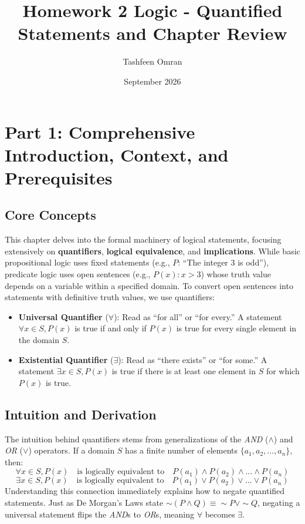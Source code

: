 \documentclass[12pt]{article}
\title{\textbf{Homework 2 Logic - Quantified Statements and Chapter Review}}
\author{Tashfeen Omran}
\date{September 2026}
\begin{document}
\maketitle
\tableofcontents
\newpage

\section{Part 1: Comprehensive Introduction, Context, and Prerequisites}

\subsection{Core Concepts}
This chapter delves into the formal machinery of logical statements, focusing extensively on \textbf{quantifiers}, \textbf{logical equivalence}, and \textbf{implications}. While basic propositional logic uses fixed statements (e.g., $P$: ``The integer 3 is odd''), predicate logic uses open sentences (e.g., $P(x): x > 3$) whose truth value depends on a variable within a specified domain. 
To convert open sentences into statements with definitive truth values, we use quantifiers:
\begin{itemize}
    \item \textbf{Universal Quantifier} ($\forall$): Read as ``for all'' or ``for every.'' A statement $\forall x \in S, P(x)$ is true if and only if $P(x)$ is true for every single element in the domain $S$.
    \item \textbf{Existential Quantifier} ($\exists$): Read as ``there exists'' or ``for some.'' A statement $\exists x \in S, P(x)$ is true if there is at least one element in $S$ for which $P(x)$ is true.
\end{itemize}

\subsection{Intuition and Derivation}
The intuition behind quantifiers stems from generalizations of the \textit{AND} ($\land$) and \textit{OR} ($\lor$) operators. If a domain $S$ has a finite number of elements $\{a_1, a_2, \dots, a_n\}$, then:
\[ \forall x \in S, P(x) \quad \text{is logically equivalent to} \quad P(a_1) \land P(a_2) \land \dots \land P(a_n) \]
\[ \exists x \in S, P(x) \quad \text{is logically equivalent to} \quad P(a_1) \lor P(a_2) \lor \dots \lor P(a_n) \]
Understanding this connection immediately explains how to negate quantified statements. Just as De Morgan's Laws state $\sim(P \land Q) \equiv \sim P \lor \sim Q$, negating a universal statement flips the \textit{AND}s to \textit{OR}s, meaning $\forall$ becomes $\exists$.
\end{document}
